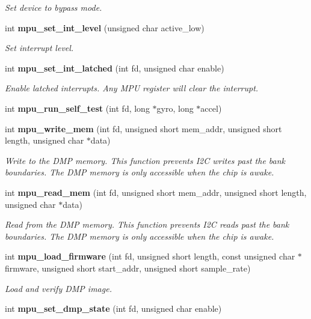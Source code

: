 \begin{DoxyCompactItemize}
\begin{DoxyCompactList}\small\item\em Set device to bypass mode. \end{DoxyCompactList}\item 
int \textbf{ mpu\+\_\+set\+\_\+int\+\_\+level} (unsigned char active\+\_\+low)
\begin{DoxyCompactList}\small\item\em Set interrupt level. \end{DoxyCompactList}\item 
int \textbf{ mpu\+\_\+set\+\_\+int\+\_\+latched} (int fd, unsigned char enable)
\begin{DoxyCompactList}\small\item\em Enable latched interrupts. Any M\+PU register will clear the interrupt. \end{DoxyCompactList}\item 
int \textbf{ mpu\+\_\+run\+\_\+self\+\_\+test} (int fd, long $\ast$gyro, long $\ast$accel)
\item 
int \textbf{ mpu\+\_\+write\+\_\+mem} (int fd, unsigned short mem\+\_\+addr, unsigned short length, unsigned char $\ast$data)
\begin{DoxyCompactList}\small\item\em Write to the D\+MP memory. This function prevents I2C writes past the bank boundaries. The D\+MP memory is only accessible when the chip is awake. \end{DoxyCompactList}\item 
int \textbf{ mpu\+\_\+read\+\_\+mem} (int fd, unsigned short mem\+\_\+addr, unsigned short length, unsigned char $\ast$data)
\begin{DoxyCompactList}\small\item\em Read from the D\+MP memory. This function prevents I2C reads past the bank boundaries. The D\+MP memory is only accessible when the chip is awake. \end{DoxyCompactList}\item 
int \textbf{ mpu\+\_\+load\+\_\+firmware} (int fd, unsigned short length, const unsigned char $\ast$firmware, unsigned short start\+\_\+addr, unsigned short sample\+\_\+rate)
\begin{DoxyCompactList}\small\item\em Load and verify D\+MP image. \end{DoxyCompactList}\item 
int \textbf{ mpu\+\_\+set\+\_\+dmp\+\_\+state} (int fd, unsigned char enable)

\end{DoxyCompactItemize}

